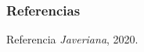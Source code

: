 
\begin{frame}[allowframebreaks]
	\frametitle{Referencias} 
	\begin{thebibliography}{100} %
		 Referencia \emph{Javeriana}, 2020.
		
	\end{thebibliography}
\end{frame}
